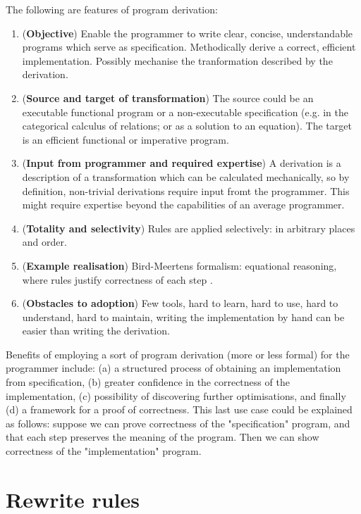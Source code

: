 \documentclass[bsc,frontabs,oneside,singlespacing,parskip,deptreport]{infthesis}
\theoremstyle{definition}
\theoremstyle{lemma}
\begin{document}
The following are features of program derivation:

\begin{enumerate}
\item (\textbf{Objective}) Enable the programmer to write clear, concise,
  understandable programs which serve as specification. Methodically
  derive a correct, efficient implementation. Possibly mechanise the
  tranformation described by the derivation.
\item (\textbf{Source and target of transformation}) The source could be an
  executable functional program or a non-executable specification
  (e.g. in the categorical calculus of relations; or as a solution to
  an equation). The target is an efficient functional or imperative
  program. 
\item (\textbf{Input from programmer and required expertise}) A derivation is a
  description of a transformation which can be calculated
  mechanically, so by definition, non-trivial derivations require
  input fromt the programmer. This might require expertise beyond the
  capabilities of an average programmer.
\item (\textbf{Totality and selectivity}) Rules are applied selectively: in arbitrary places and order.
\item (\textbf{Example realisation}) Bird-Meertens formalism: equational
  reasoning, where rules justify correctness of each step \cite{gibbons1994introduction}.
\item (\textbf{Obstacles to adoption}) Few tools, hard to learn, hard to use,
  hard to understand, hard to maintain, writing the implementation by
  hand can be easier than writing the derivation.
\end{enumerate}

Benefits of employing a sort of program derivation (more or less
formal) for the programmer include: (a) a structured process of
obtaining an implementation from specification, (b) greater confidence
in the correctness of the implementation, (c) possibility of
discovering further optimisations, and finally (d) a framework for a
proof of correctness. This last use case could be explained as
follows: suppose we can prove correctness of the "specification"
program, and that each step preserves the meaning of the program. Then
we can show correctness of the "implementation" program.

\section{Rewrite rules}
\label{sec:rewrite-rules}
\end{document}
